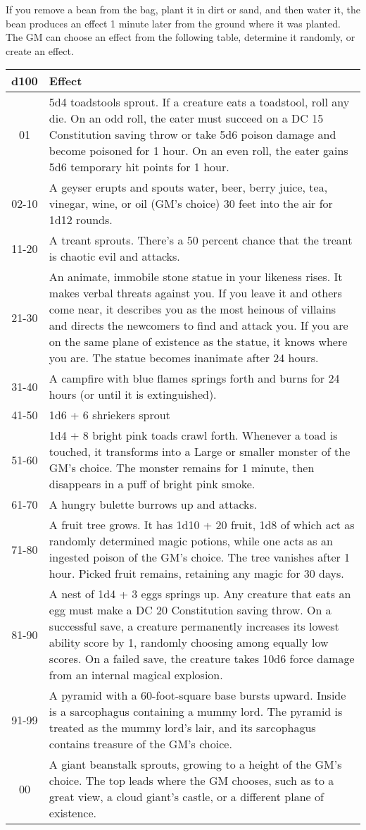 \documentclass[
]{article}
\begin{document}
If you remove a bean from the bag, plant it in dirt or sand, and then
water it, the bean produces an effect 1 minute later from the ground
where it was planted. The GM can choose an effect from the following
table, determine it randomly, or create an effect.

\begin{longtable}[]{@{}cl@{}}
\toprule
d100 & Effect\tabularnewline
\midrule
\endhead
01 & 5d4 toadstools sprout. If a creature eats a toadstool, roll any
die. On an odd roll, the eater must succeed on a DC 15 Constitution
saving throw or take 5d6 poison damage and become poisoned for 1 hour.
On an even roll, the eater gains 5d6 temporary hit points for 1
hour.\tabularnewline
02-10 & A geyser erupts and spouts water, beer, berry juice, tea,
vinegar, wine, or oil (GM's choice) 30 feet into the air for 1d12
rounds.\tabularnewline
11-20 & A treant sprouts. There's a 50 percent chance that the treant is
chaotic evil and attacks.\tabularnewline
21-30 & An animate, immobile stone statue in your likeness rises. It
makes verbal threats against you. If you leave it and others come near,
it describes you as the most heinous of villains and directs the
newcomers to find and attack you. If you are on the same plane of
existence as the statue, it knows where you are. The statue becomes
inanimate after 24 hours.\tabularnewline
31-40 & A campfire with blue flames springs forth and burns for 24 hours
(or until it is extinguished).\tabularnewline
41-50 & 1d6 + 6 shriekers sprout\tabularnewline
51-60 & 1d4 + 8 bright pink toads crawl forth. Whenever a toad is
touched, it transforms into a Large or smaller monster of the GM's
choice. The monster remains for 1 minute, then disappears in a puff of
bright pink smoke.\tabularnewline
61-70 & A hungry bulette burrows up and attacks.\tabularnewline
71-80 & A fruit tree grows. It has 1d10 + 20 fruit, 1d8 of which act as
randomly determined magic potions, while one acts as an ingested poison
of the GM's choice. The tree vanishes after 1 hour. Picked fruit
remains, retaining any magic for 30 days.\tabularnewline
81-90 & A nest of 1d4 + 3 eggs springs up. Any creature that eats an egg
must make a DC 20 Constitution saving throw. On a successful save, a
creature permanently increases its lowest ability score by 1, randomly
choosing among equally low scores. On a failed save, the creature takes
10d6 force damage from an internal magical explosion.\tabularnewline
91-99 & A pyramid with a 60-foot-square base bursts upward. Inside is a
sarcophagus containing a mummy lord. The pyramid is treated as the mummy
lord's lair, and its sarcophagus contains treasure of the GM's
choice.\tabularnewline
00 & A giant beanstalk sprouts, growing to a height of the GM's choice.
The top leads where the GM chooses, such as to a great view, a cloud
giant's castle, or a different plane of existence.\tabularnewline
\bottomrule
\end{longtable}
\end{document}
